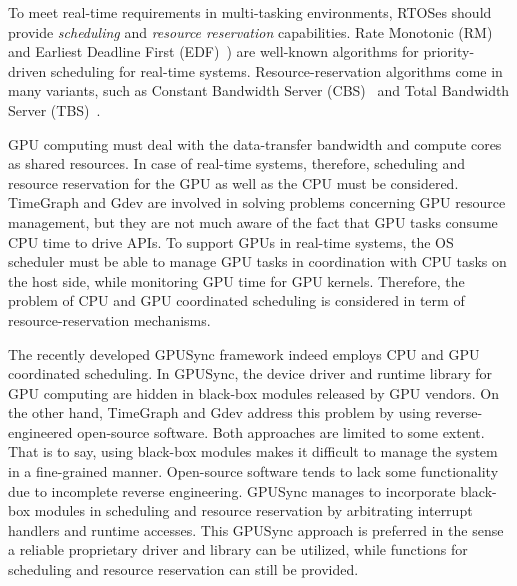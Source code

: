 To meet real-time requirements in multi-tasking environments, RTOSes should provide \textit{scheduling} and \textit{resource reservation} capabilities.
Rate Monotonic (RM) and Earliest Deadline First (EDF)~\cite{sched:ll}) are well-known algorithms for priority-driven scheduling for real-time systems.
Resource-reservation algorithms come in many variants, such as Constant Bandwidth Server (CBS)~\cite{rr:cbs} and Total Bandwidth Server (TBS)~\cite{rr:tbs2}.

GPU computing must deal with the data-transfer bandwidth and compute cores as shared resources.
In case of real-time systems, therefore, scheduling and resource reservation for the GPU as well as the CPU must be considered.
TimeGraph and Gdev are involved in solving problems concerning GPU resource management, but they are not much aware of the fact that GPU tasks consume CPU time to drive APIs.
To support GPUs in real-time systems, the OS scheduler must be able to manage GPU tasks in coordination with CPU tasks on the host side, while monitoring GPU time for GPU kernels.
Therefore, the problem of CPU and GPU coordinated scheduling is considered in term of resource-reservation mechanisms.

The recently developed GPUSync framework indeed employs CPU and GPU coordinated scheduling.
In GPUSync, the device driver and runtime library for GPU computing are hidden in black-box modules released by GPU vendors.
On the other hand, TimeGraph and Gdev address this problem by using reverse-engineered open-source software.
Both approaches are limited to some extent.
That is to say, using black-box modules makes it difficult to manage the system in a fine-grained manner.
Open-source software tends to lack some functionality due to incomplete reverse engineering.
GPUSync manages to incorporate black-box modules in scheduling and resource reservation by arbitrating interrupt handlers and runtime accesses.
This GPUSync approach is preferred in the sense a reliable proprietary driver and library can be utilized, while functions for scheduling and resource reservation can still be provided.

